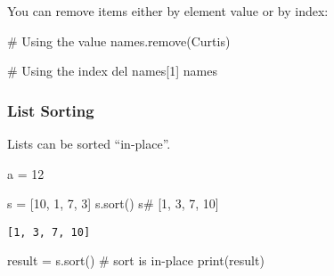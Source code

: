 \documentclass[
  letterpaper,
  DIV=11,
  numbers=noendperiod]{scrreprt}
\newenvironment{Shaded}{\begin{snugshade}}{\end{snugshade}}
\newcommand{\BuiltInTok}[1]{\textcolor[rgb]{0.00,0.46,0.62}{#1}}
\newcommand{\CommentTok}[1]{\textcolor[rgb]{0.37,0.37,0.37}{#1}}
\newcommand{\DecValTok}[1]{\textcolor[rgb]{0.68,0.00,0.00}{#1}}
\newcommand{\KeywordTok}[1]{\textcolor[rgb]{0.00,0.46,0.62}{#1}}
\newcommand{\NormalTok}[1]{\textcolor[rgb]{0.00,0.46,0.62}{#1}}
\newcommand{\OperatorTok}[1]{\textcolor[rgb]{0.37,0.37,0.37}{#1}}
\newcommand{\StringTok}[1]{\textcolor[rgb]{0.13,0.47,0.30}{#1}}
\begin{document}
You can remove items either by element value or by index:

\begin{Shaded}
\begin{Highlighting}[]
\CommentTok{\# Using the value}
\NormalTok{names.remove(}\StringTok{\textquotesingle{}Curtis\textquotesingle{}}\NormalTok{)}
\end{Highlighting}
\end{Shaded}

\begin{Shaded}
\begin{Highlighting}[]
\CommentTok{\# Using the index}
\KeywordTok{del}\NormalTok{ names[}\DecValTok{1}\NormalTok{]}
\NormalTok{names}
\end{Highlighting}
\end{Shaded}

\hypertarget{list-sorting}{%
\subsubsection{List Sorting}\label{list-sorting}}

Lists can be sorted ``in-place''.

\begin{Shaded}
\begin{Highlighting}[]
\NormalTok{a }\OperatorTok{=} \DecValTok{12}
\end{Highlighting}
\end{Shaded}

\begin{Shaded}
\begin{Highlighting}[]
\NormalTok{s }\OperatorTok{=}\NormalTok{ [}\DecValTok{10}\NormalTok{, }\DecValTok{1}\NormalTok{, }\DecValTok{7}\NormalTok{, }\DecValTok{3}\NormalTok{]}
\NormalTok{s.sort()  }
\NormalTok{s}\CommentTok{\# [1, 3, 7, 10]}
\end{Highlighting}
\end{Shaded}

\begin{verbatim}
[1, 3, 7, 10]
\end{verbatim}

\begin{Shaded}
\begin{Highlighting}[]
\NormalTok{result }\OperatorTok{=}\NormalTok{ s.sort()     }\CommentTok{\# sort is in{-}place}
\BuiltInTok{print}\NormalTok{(result)}
\end{Highlighting}
\end{Shaded}
\end{document}

